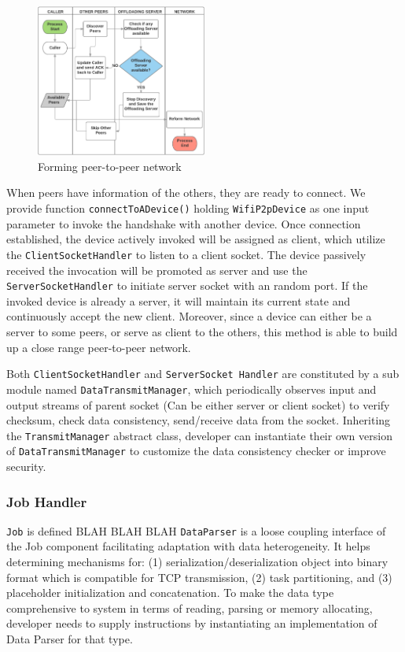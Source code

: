 \documentclass[conference]{IEEEtran}
\begin{document}
\begin{figure}[H]
\centerline {
\includegraphics[width=0.5\textwidth, natwidth=1127, natheight=615]{data/discoverPeers}
}
\caption{Forming peer-to-peer network}
\label{fig:forming}
\end{figure}

When peers have information of the others, they are ready to connect. We provide function \texttt{connectToADevice()} holding \texttt{WifiP2pDevice} as one input parameter to invoke the handshake with another device. Once connection established, the device actively invoked will be assigned as client, which utilize the \texttt{ClientSocketHandler} to listen to a client socket. The device passively received the invocation will be promoted as server and use the \texttt{ServerSocketHandler} to initiate server socket with an random port. If the invoked device is already a server, it will maintain its current state and continuously accept the new client. Moreover, since a device can either be a server to some peers, or serve as client to the others, this method is able to build up a close range peer-to-peer network.

Both \texttt{ClientSocketHandler} and \texttt{ServerSocket Handler} are constituted by a sub module named \texttt{DataTransmitManager}, which periodically observes input and output streams of parent socket (Can be either server or client socket) to verify checksum, check data consistency, send/receive data from the socket. Inheriting the \texttt{TransmitManager} abstract class, developer can instantiate their own version of \texttt{DataTransmitManager} to customize the data consistency checker or improve security. 

\subsubsection{Job Handler}
\texttt{Job} is defined BLAH BLAH BLAH
\texttt{DataParser} is a loose coupling interface of the Job component facilitating adaptation with data heterogeneity. It helps determining mechanisms for: (1) serialization/deserialization object into binary format which is compatible for TCP transmission, (2) task partitioning, and (3) placeholder initialization and concatenation. To make the data type comprehensive to system in terms of reading, parsing or memory allocating, developer needs to supply instructions by instantiating an implementation of Data Parser for that type. 
\end{document}
